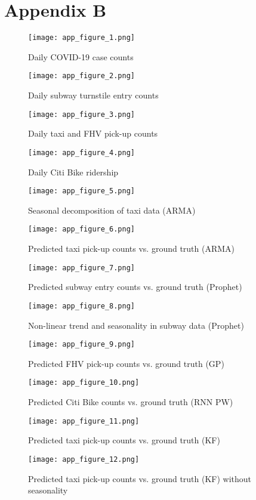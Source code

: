 \documentclass{article}
\begin{document}
\newpage
\section*{Appendix B}
\setcounter{figure}{0}

\begin{figure}[h!]
  \centering
  \texttt{[image: app\_figure\_1.png]}
  \caption{Daily COVID-19 case counts}
  \texttt{[image: app\_figure\_2.png]}
  \caption{Daily subway turnstile entry counts}
  \texttt{[image: app\_figure\_3.png]}
  \caption{Daily taxi and FHV pick-up counts}
  \texttt{[image: app\_figure\_4.png]}
  \caption{Daily Citi Bike ridership}
  \texttt{[image: app\_figure\_5.png]}
  \caption{Seasonal decomposition of taxi data (ARMA)}
\end{figure}

\begin{figure}[h]
  \centering
  \texttt{[image: app\_figure\_6.png]}
  \caption{Predicted taxi pick-up counts vs. ground truth (ARMA)}
  \texttt{[image: app\_figure\_7.png]}
  \caption{Predicted subway entry counts vs. ground truth (Prophet)}
  \texttt{[image: app\_figure\_8.png]}
  \caption{Non-linear trend and seasonality in subway data (Prophet)}
\end{figure}

\begin{figure}[h]
    \centering
  \texttt{[image: app\_figure\_9.png]}
  \caption{Predicted FHV pick-up counts vs. ground truth (GP)}
  \texttt{[image: app\_figure\_10.png]}
  \caption{Predicted Citi Bike counts vs. ground truth (RNN PW)}
  \texttt{[image: app\_figure\_11.png]}
  \caption{Predicted taxi pick-up counts vs. ground truth (KF)}
  \texttt{[image: app\_figure\_12.png]}
  \caption{Predicted taxi pick-up counts vs. ground truth (KF) without seasonality}
\end{figure}
\end{document}
